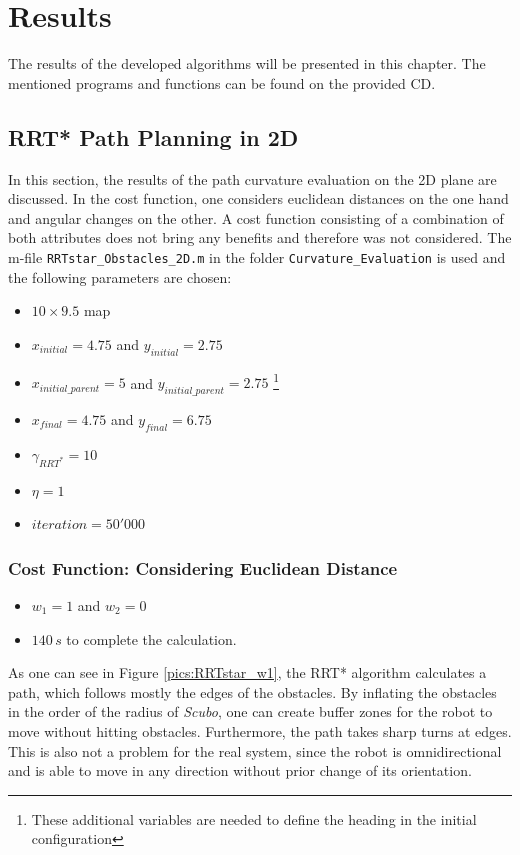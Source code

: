 \chapter{Results}
\label{sec:results}
The results of the developed algorithms will be presented in this chapter. The mentioned programs and functions can be found on the provided CD.   

\section{RRT* Path Planning in 2D}

In this section, the results of the path curvature evaluation on the 2D plane are discussed. In the cost function, one considers euclidean distances on the one hand and angular changes on the other. A cost function consisting of a combination of both attributes does not bring any benefits and therefore was not considered. The m-file \verb+RRTstar_Obstacles_2D.m+ in the folder \verb|Curvature_Evaluation| is used and the following parameters are chosen:

\begin{itemize}
	\item
	$10 \times 9.5$ map
	\item
	$x_{initial}=4.75$ and $y_{initial}=2.75$
	\item
	$x_{initial\_parent}=5$ and $y_{initial\_parent}=2.75$ \footnote{These additional variables are needed to define the heading in the initial configuration}
	\item
	$x_{final}=4.75$ and $y_{final}=6.75$ 
	\item 
	$\gamma_{RRT^{*}}=10$
	\item
	$\eta=1$
	\item
	$iteration=50'000$
\end{itemize} 

\subsection{Cost Function: Considering Euclidean Distance}
\label{sec:euclidean}

\begin{itemize}
	\item
	$w_{1}=1$ and $w_{2}=0$
	\item
	$140\,s$ to complete the calculation.
\end{itemize} 

As one can see in Figure \ref{pics:RRTstar_w1}, the RRT* algorithm calculates a path, which follows mostly the edges of the obstacles. By inflating the obstacles in the order of the radius of \textit{Scubo}, one can create buffer zones for the robot to move without hitting obstacles. Furthermore, the path takes sharp turns at edges. This is also not a problem for the real system, since the robot is omnidirectional and is able to move in any direction without prior change of its orientation.

